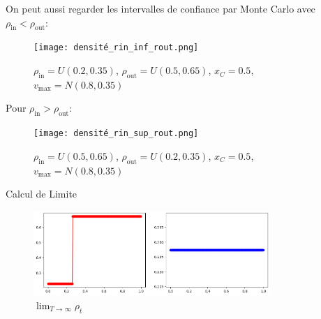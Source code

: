 \documentclass[10pt]{beamer}
\begin{document}
\begin{frame}
     On peut aussi regarder les intervalles de confiance par Monte Carlo avec \( \rho_{\text{in}} < \rho_{\text{out}} \): 
        \begin{figure}[h!]
            \centering
            \texttt{[image: densité\_rin\_inf\_rout.png]} %
            \caption{\( \rho_{\text{in}} = U(0.2,0.35)\), \( \rho_{\text{out}} = U(0.5,0.65) \), \( x_C = 0.5 \), \( v_{\text{max}} = N(0.8,0.35) \)}
        \end{figure}
        
\end{frame}


\begin{frame}
    Pour \( \rho_{\text{in}} > \rho_{\text{out}} \): 
       \begin{figure}[h!]
           \centering
           \texttt{[image: densité\_rin\_sup\_rout.png]} %
           \caption{\( \rho_{\text{in}} = U(0.5,0.65)\), \( \rho_{\text{out}} = U(0.2,0.35) \), \( x_C = 0.5 \), \( v_{\text{max}} = N(0.8,0.35) \)}
       \end{figure}
       
\end{frame}

\begin{frame}{Calcul de Limite}
    
    \begin{figure}
        \centering
        \includegraphics[width=0.8\textwidth]{limite_burgers.png}
        \caption{$\lim_{T \to \infty} \rho_t$}
    \end{figure}
\end{frame}
\end{document}
